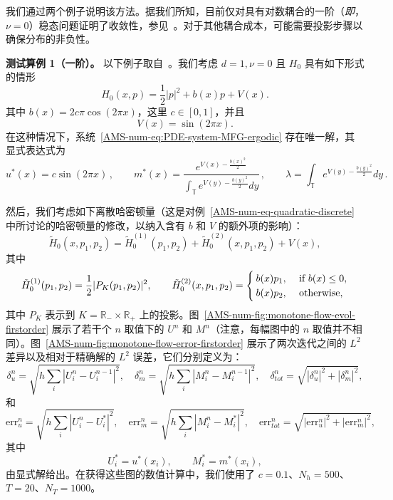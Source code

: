 \documentclass{amsproc}
\theoremstyle{definition}
\theoremstyle{remark}
\numberwithin{equation}{section}
\newcommand{\RR}{{\mathbb R}}
\newcommand{\TT}{{\mathbb T}}
\begin{document}
 我们通过两个例子说明该方法。据我们所知，目前仅对具有对数耦合的一阶（\textit{即}，$\nu=0$）稳态问题证明了收敛性，参见~\cite{MR3698446}。对于其他耦合成本，可能需要投影步骤以确保分布的非负性。



\textbf{测试算例 1（一阶）。} 以下例子取自~\cite{MR3698446}。我们考虑 $d=1, \nu = 0$ 且 $H_0$ 具有如下形式的情形
$$
	H_0(x,p) = \frac{1}{2} |p|^2 + b(x) p + V(x).
$$
其中 $b(x) = 2 c \pi \cos(2 \pi x)$，这里 $c \in [0,1]$，并且 
$$
	V(x) = \sin(2 \pi x).
$$
在这种情况下，系统~\eqref{AMS-num-eq:PDE-system-MFG-ergodic} 存在唯一解，其显式表达式为
$$
	u^*(x) = c \sin(2 \pi x) \, , 
	\qquad
	m^*(x) = \frac{e^{V(x) - \frac{b(x)^2}{2}}}{ \int_{\TT} e^{V(y) - \frac{b(y)^2}{2}} dy } \,, 
	\qquad 
	\lambda =  \int_{\TT} e^{V(y) - \frac{b(y)^2}{2}} dy \,.
$$

然后，我们考虑如下离散哈密顿量（这是对例~\ref{AMS-num-eq-quadratic-discrete} 中所讨论的哈密顿量的修改，以纳入含有 $b$ 和 $V$ 的额外项的影响）：
$$
	\tilde{H}_0(x, p_1, p_2) = \tilde{H}_0^{(1)}(p_1, p_2) + \tilde{H}_0^{(2)}(x, p_1, p_2) + V(x) ,
$$ 
其中
$$
	\tilde{H}_0^{(1)}(p_1, p_2) = \frac{1}{2}|P_K(p_1,p_2)|^2,
	\qquad
	\tilde{H}_0^{(2)}(x, p_1, p_2) = 
	\begin{cases}
		b(x) p_1, & \hbox{ if } b(x) \le 0,
		\\
		b(x) p_2, & \hbox{ otherwise, }
	\end{cases}
$$
其中 $P_K$ 表示到 $K = \RR_- \times \RR_+$ 上的投影。图~\ref{AMS-num-fig:monotone-flow-evol-firstorder} 展示了若干个 $n$ 取值下的 $U^n$ 和 $M^n$（注意，每幅图中的 $n$ 取值并不相同）。图~\ref{AMS-num-fig:monotone-flow-error-firstorder} 展示了两次迭代之间的 $L^2$ 差异以及相对于精确解的 $L^2$ 误差，它们分别定义为：
\begin{equation}
\label{AMS-num-eq:monotoneop-def-deltas}
	\delta^n_u = \sqrt{ h \sum_i | U^{n}_i - U^{n-1}_i|^2 }, \quad 
	\delta^n_m = \sqrt{ h \sum_i | M^{n}_i - M^{n-1}_i|^2 }, \quad   
	\delta^n_{tot} = \sqrt{|\delta^n_u|^2 + |\delta^n_m|^2},
\end{equation}
和
\begin{equation}
\label{AMS-num-eq:monotoneop-def-errors}
	\text{err}^n_u = \sqrt{ h \sum_i | U^{n}_i - U^{*}_i|^2 }, \quad 
	\text{err}^n_m = \sqrt{ h \sum_i | M^{n}_i - M^{*}_i|^2 }, \quad   
	\text{err}^n_{tot} = \sqrt{|\text{err}^n_u|^2 + |\text{err}^n_m|^2}, 
\end{equation}
其中 
$$
	U^{*}_i =  u^*(x_i),
	\qquad
	M^{*}_i = m^*(x_i),
$$
由显式解给出。在获得这些图的数值计算中，我们使用了 $c = 0.1$、$N_h = 500$、$T = 20$、$N_T = 1000$。
\end{document}
